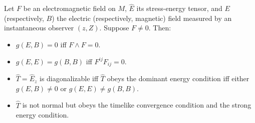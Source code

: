Let $F$ be an electromagnetic field on $M$, $\hat{E}$ its stress-energy tensor, and $E$ (respectively, $B$) the electric (respectively, magnetic) field measured by an instantaneous observer $(z, Z)$. Suppose $F \neq 0$. Then:
\begin{itemize}
\item[(a)] $g(E, B) = 0$ iff $F \wedge F = 0$.
\item[(b)] $g(E, E) = g(B, B)$ iff $F^{ij}F_{ij} = 0$.
\item[(c)] $\hat{T} = \hat{E}_z$ is diagonalizable iff $\hat{T}$ obeys the dominant energy condition iff either $g(E, B) \neq 0$ or $g(E, E) \neq g(B, B)$.
\item[(d)] $\hat{T}$ is not normal but obeys the timelike convergence condition and the strong energy condition.
\end{itemize}
